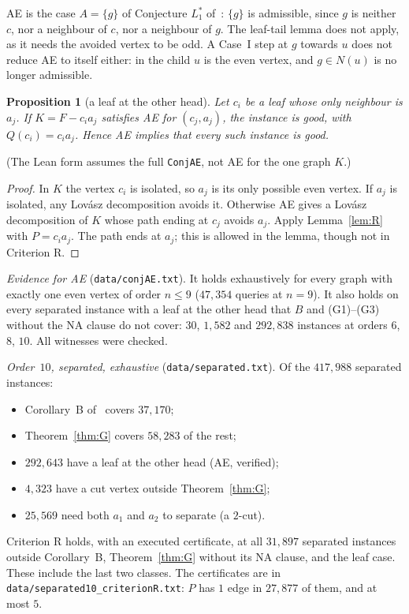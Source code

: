 \documentclass[11pt]{amsart}
\newtheorem{proposition}[theorem]{Proposition}
\theoremstyle{definition}
\newcommand{\lean}[1]{\quad{\footnotesize[Lean: \texttt{#1}]}}
\begin{document}
AE is the case $A=\{g\}$ of Conjecture $L_1^*$ of~\cite{L1I}: $\{g\}$ is admissible, since $g$ is
neither $c$, nor a neighbour of $c$, nor a neighbour of $g$. The leaf-tail lemma does not apply, as it needs the
avoided vertex to be odd. A Case~I step at $g$ towards $u$ does not reduce AE to itself either: in the child $u$ is
the even vertex, and $g\in N(u)$ is no longer admissible.

\begin{proposition}[a leaf at the other head]\label{prop:leafhead}
Let $c_i$ be a leaf whose only neighbour is $a_j$. If $K=F-c_ia_j$ satisfies AE for $(c_j,a_j)$, the
instance is good, with $Q(c_i)=c_ia_j$. Hence AE implies that every such instance is good.
\lean{ln2\_of\_leaf\_at\_head}
\end{proposition}
(The Lean form assumes the full \texttt{ConjAE}, not AE for the one graph $K$.)

\begin{proof}
In $K$ the vertex $c_i$ is isolated, so $a_j$ is its only possible even vertex. If $a_j$ is
isolated, any Lov\'asz decomposition avoids it. Otherwise AE gives a Lov\'asz decomposition of $K$ whose
path ending at $c_j$ avoids $a_j$. Apply Lemma~\ref{lem:R} with $P=c_ia_j$. The path ends at $a_j$; this is allowed
in the lemma, though not in Criterion R.
\end{proof}

\emph{Evidence for AE} (\texttt{data/conjAE.txt}). It holds exhaustively for every graph with
exactly one even vertex of order $n\le9$ ($47{,}354$ queries at $n=9$). It also holds on every separated
instance with a leaf at the other head that $B$ and (G1)--(G3) without the NA clause do not cover: $30$, $1{,}582$ and
$292{,}838$ instances at orders $6$, $8$, $10$. All witnesses were checked.

\emph{Order~$10$, separated, exhaustive} (\texttt{data/separated.txt}). Of the $417{,}988$ separated
instances:
\begin{itemize}
\item Corollary~B of~\cite{LN} covers $37{,}170$;
\item Theorem~\ref{thm:G} covers $58{,}283$ of the rest;
\item $292{,}643$ have a leaf at the other head (AE, verified);
\item $4{,}323$ have a cut vertex outside Theorem~\ref{thm:G};
\item $25{,}569$ need both $a_1$ and $a_2$ to separate (a $2$-cut).
\end{itemize}
Criterion R holds, with an executed certificate, at all $31{,}897$ separated instances outside
Corollary~B, Theorem~\ref{thm:G} without its NA clause, and the leaf case. These include the last two
classes. The certificates are in \texttt{data/separated10\_criterionR.txt}: $P$ has $1$ edge in $27{,}877$ of
them, and at most $5$.
\end{document}
